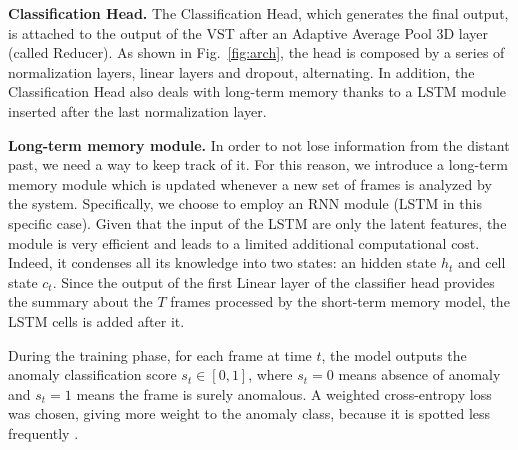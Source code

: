 \noindent\textbf{Classification Head.}
The Classification Head, which generates the final output, is attached to the output of the VST after an Adaptive Average Pool 3D layer (called Reducer).
As shown in Fig.~\ref{fig:arch}, the head is composed by a series of normalization layers, linear layers and dropout, alternating. 
In addition, the Classification Head also deals with long-term memory thanks to a LSTM module inserted after the last normalization layer.






\noindent\textbf{Long-term memory module.}
In order to not lose information from the distant past, we need a way to keep track of it.
For this reason, we introduce a long-term memory module  which is updated whenever a new set of frames is analyzed by the system.
Specifically, we choose to employ an RNN module (LSTM \cite{lstm,gru} in this specific case).
Given that the input of the LSTM  are only the latent features, the module is very efficient and leads to a limited additional computational cost.
Indeed, it condenses all its knowledge into two states: an hidden state $h_t$ and cell state $c_t$.
Since the output of the first Linear layer of the classifier head provides the summary about the $T$ frames processed by the short-term memory model, the LSTM cells is added after it.





During the training phase, for each frame at time $t$, the model outputs the anomaly classification score $s_t \in [0,1]$, where $s_t=0$ means absence of anomaly and $s_t=1$ means the frame is surely anomalous.
A weighted cross-entropy loss was chosen, giving more weight to the anomaly class, because it is spotted less frequently  .